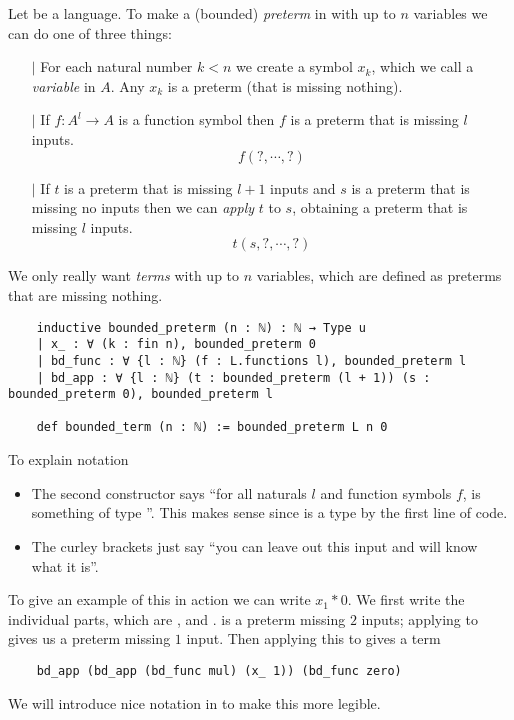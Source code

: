 \begin{dfn}[Terms]
  Let  be a language.
  To make a (bounded) \textit{preterm} in  with up to $n$ variables
  we can do one of three things:
  \begin{itemize}
    \item[$\vert$] For each natural number $k < n$ we create a symbol
          $x_{k}$, which we call a \textit{variable} in $A$.
          Any $x_{k}$ is a preterm (that is missing nothing).
    \item[$\vert$] If $f : A^{l} \to A$ is a function symbol then
          $f$ is a preterm that is missing $l$ inputs.
          \[ f( ? , \cdots , ? )\]
    \item[$\vert$] If $t$ is a preterm that is missing
          $l + 1$ inputs and $s$ is a preterm that is missing
          no inputs then we can \textit{apply} $t$ to $s$, obtaining
          a preterm that is missing $l$ inputs.
          \[ t(s , ? , \cdots, ? )\]
  \end{itemize}

  We only really want \textit{terms} with up to $n$ variables,
  which are defined as preterms that are missing nothing.

  \begin{lstlisting}
    inductive bounded_preterm (n : ℕ) : ℕ → Type u
    | x_ : ∀ (k : fin n), bounded_preterm 0
    | bd_func : ∀ {l : ℕ} (f : L.functions l), bounded_preterm l
    | bd_app : ∀ {l : ℕ} (t : bounded_preterm (l + 1)) (s : bounded_preterm 0), bounded_preterm l

    def bounded_term (n : ℕ) := bounded_preterm L n 0\end{lstlisting}

  To explain notation
  \begin{itemize}
    \item The second constructor says ``for all naturals $l$ and function symbols $f$,
           is something of type ''.
          This makes sense since  is a type by the first line of code.
    \item The curley brackets just say
          ``you can leave out this input and  will know what it is''.
  \end{itemize}

  To give an example of this in action we can write $x_{1} * 0$.
  We first write the individual parts, which are
  ,  and
  .
   is a preterm missing $2$ inputs;
  applying  to  gives us a preterm 
  missing $1$ input.
  Then applying this to  gives a term
  \begin{lstlisting}
    bd_app (bd_app (bd_func mul) (x_ 1)) (bd_func zero) \end{lstlisting}
  We will introduce nice notation in  to make this more legible.
\end{dfn}

